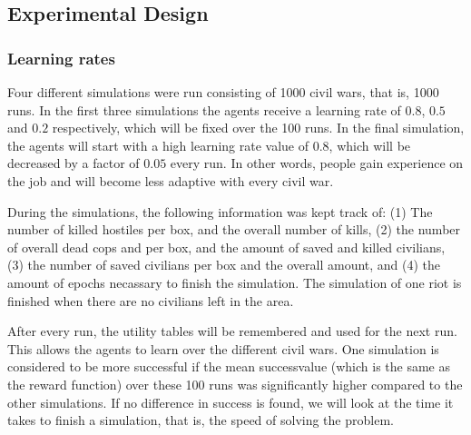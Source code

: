 \subsection{Experimental Design}
\subsubsection{Learning rates}
Four different simulations were run consisting of 1000 civil wars, that is, 1000 runs. In the first three simulations the agents receive a learning rate of $0.8$, $0.5$ and $0.2$ respectively, which will be fixed over the 100 runs. In the final simulation, the agents will start with a high learning rate value of $0.8$, which will be decreased by a factor of $0.05$ every run. In other words, people gain experience on the job and will become less adaptive with every civil war.

During the simulations, the following information was kept track of: (1) The number of killed hostiles per box, and the overall number of kills, (2) the number of overall dead cops and per box, and the amount of saved and killed civilians, (3) the number of saved civilians per box and the overall amount, and (4) the amount of epochs necassary to finish the simulation. The simulation of one riot is finished when there are no civilians left in the area.
 
After every run, the utility tables will be remembered and used for the next run. This allows the agents to learn over the different civil wars. One simulation is considered to be more successful if the mean successvalue (which is the same as the reward function) over these 100 runs was significantly higher compared to the other simulations. If no difference in success is found, we will look at the time it takes to finish a simulation, that is, the speed of solving the problem. 
